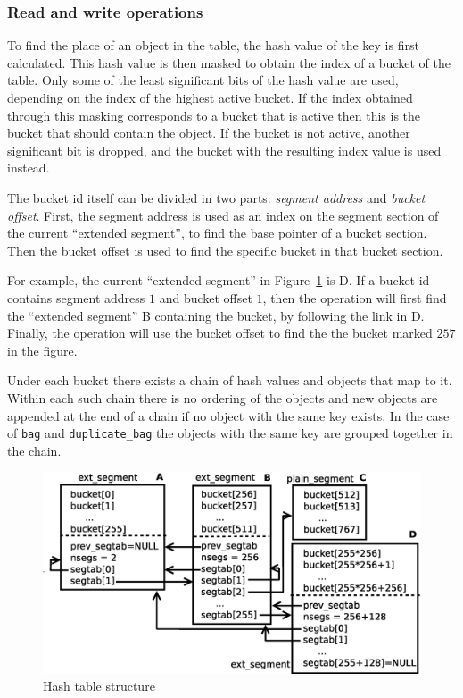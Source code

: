 \documentclass[aps,pre,preprint,nofootinbib]{revtex4}
\begin{document}
\subsubsection{Read and write operations}

To find the place of an object in the table, the hash value of the key is first calculated.
This hash value is then masked to obtain the index of a bucket of the table.
Only some of the least significant bits of the hash value are used, depending on the index of the highest active bucket.
If the index obtained through this masking corresponds to a bucket that is active then this is the bucket that should contain the object.
If the bucket is not active, another significant bit is dropped, and the bucket with the resulting index value is used instead.
 

The bucket id itself can be divided in two parts: \emph{segment address} and \emph{bucket offset}.
First, the segment address is used as an index on the segment section of the current ``extended segment'', to find the base pointer of a bucket section.
Then the bucket offset is used to find the specific bucket in that bucket section.

For example, the current ``extended segment'' in Figure~\ref{fig:hash_table_structure} is D.
If a bucket id contains segment address $1$ and bucket offset $1$, then the operation will first find the ``extended segment'' B containing the bucket, by following the link in D. Finally, the operation will use the bucket offset to find the the bucket marked $257$ in the figure.

Under each bucket there exists a chain of hash values and objects that map to it.
Within each such chain there is no ordering of the objects and new objects are appended at the end of a chain if no object with the same key exists.
In the case of \verb|bag| and \verb|duplicate_bag| the objects with the same key are grouped together in the chain.

\begin{figure}[htb]
  \centering
  \includegraphics[width=1.0\textwidth]{hash_table_structure.eps}
  \caption{Hash table structure}
  \label{fig:hash_table_structure}
\end{figure}
\end{document}
